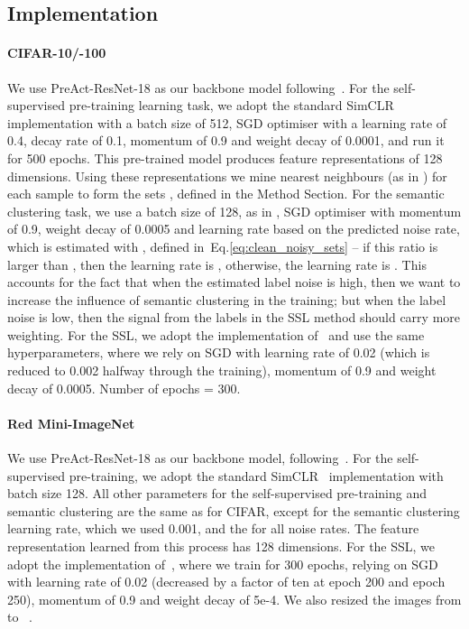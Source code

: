 \documentclass[review]{elsarticle}
\theoremstyle{plain}
\begin{document}
\subsection{Implementation}
\label{sec:implementation}




\paragraph{CIFAR-10/-100}
We use PreAct-ResNet-18 
as our backbone model following~\citep{li2020dividemix}. For the self-supervised pre-training learning task, we adopt the standard SimCLR~\citep{SimCLR} implementation with a batch size of 512, SGD optimiser with a learning rate of 0.4, decay rate of 0.1, momentum of 0.9 and weight decay of 0.0001, and run it for 500 epochs.  This pre-trained model produces feature representations of 128 dimensions. Using these representations we mine  nearest neighbours (as in \citep{SCAN}) for each sample to form the sets , defined in the Method Section. 
For the semantic clustering task, we use a batch size of 128,  as in \citep{SCAN}, SGD optimiser with momentum of 0.9, weight decay of 0.0005 and learning rate  based on the predicted noise rate, which is estimated with , defined in~Eq.\ref{eq:clean_noisy_sets} -- if this ratio is larger than , then the learning rate is , otherwise, the learning rate is .  This accounts for the fact that when the estimated label noise is high, then we want to increase the influence of semantic clustering in the training; but when the label noise is low, then the signal from the labels in the SSL method should carry more weighting. For the SSL, we adopt the implementation of~\citep{li2020dividemix} and use the same hyperparameters, where we rely on SGD with learning rate of 0.02 (which is reduced to 0.002 halfway through the training), momentum of 0.9 and weight decay of 0.0005. Number of epochs  = 300. 

\paragraph{Red Mini-ImageNet} We use PreAct-ResNet-18 as our backbone model, following~\citep{FaMUS}. For the self-supervised pre-training, we adopt the standard SimCLR~\citep{SimCLR} implementation with batch size 128. All other parameters for the self-supervised pre-training and semantic clustering are the same as for CIFAR, except for the semantic clustering learning rate, which we used 0.001, and the  for all noise rates. The feature representation learned from this process has 128 dimensions. For the SSL, we adopt the implementation of~\citep{FaMUS}, where we train for 300 epochs,  relying on SGD with learning rate of 0.02 (decreased by a factor of ten at epoch 200 and epoch 250), momentum of 0.9 and weight decay of 5e-4. We also resized the images from  to ~\citep{FaMUS}.
\end{document}
